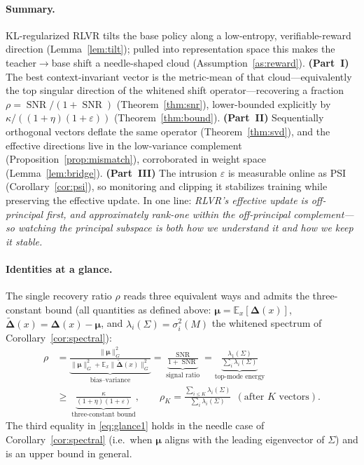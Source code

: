 \documentclass[11pt]{article}
\DeclareMathOperator{\SNR}{SNR}
\newcommand{\E}{\mathbb{E}}
\newcommand{\bDelta}{\bm{\Delta}}
\newcommand{\bmu}{\bm{\mu}}
\newcommand{\Gnorm}[1]{\lVert #1\rVert_G}
\begin{document}
\paragraph{Summary.}
KL-regularized RLVR tilts the base policy along a low-entropy, verifiable-reward direction
(Lemma~\ref{lem:tilt}); pulled into representation space this makes the teacher$\to$base shift a
needle-shaped cloud (Assumption~\ref{as:reward}). \textbf{(Part~I)} The best context-invariant vector
is the metric-mean of that cloud---equivalently the top singular direction of the whitened shift
operator---recovering a fraction $\rho=\SNR/(1{+}\SNR)$ (Theorem~\ref{thm:snr}), lower-bounded
explicitly by $\kappa/((1{+}\eta)(1{+}\varepsilon))$ (Theorem~\ref{thm:bound}). \textbf{(Part~II)}
Sequentially orthogonal vectors deflate the same operator (Theorem~\ref{thm:svd}), and the effective
directions live in the low-variance complement (Proposition~\ref{prop:mismatch}), corroborated in
weight space (Lemma~\ref{lem:bridge}). \textbf{(Part~III)} The intrusion $\varepsilon$ is measurable
online as PSI (Corollary~\ref{cor:psi}), so monitoring and clipping it stabilizes training while
preserving the effective update. In one line: \emph{RLVR's effective update is off-principal first,
and approximately rank-one within the off-principal complement---so watching the principal subspace
is both how we understand it and how we keep it stable.}

\paragraph{Identities at a glance.}
The single recovery ratio $\rho$ reads three equivalent ways and admits the three-constant bound
(all quantities as defined above: $\bmu=\E_x[\bDelta(x)]$, $\tilde{\bDelta}(x)=\bDelta(x)-\bmu$,
and $\lambda_i(\Sigma)=\sigma_i^2(M)$ the whitened spectrum of Corollary~\ref{cor:spectral}):
\begin{align}
\rho
&=\underbrace{\frac{\Gnorm{\bmu}^2}{\Gnorm{\bmu}^2+\E_x\Gnorm{\tilde{\bDelta}(x)}^2}}_{\text{bias--variance}}
 =\underbrace{\frac{\SNR}{1+\SNR}}_{\text{signal ratio}}
 =\underbrace{\frac{\lambda_1(\Sigma)}{\sum_i\lambda_i(\Sigma)}}_{\text{top-mode energy}}
 \label{eq:glance1}\\[6pt]
&\ge\ \underbrace{\frac{\kappa}{(1+\eta)(1+\varepsilon)}}_{\text{three-constant bound}},
 \qquad
 \rho_K=\frac{\sum_{i\le K}\lambda_i(\Sigma)}{\sum_i\lambda_i(\Sigma)}\ \ (\text{after $K$ vectors}).
 \label{eq:glance2}
\end{align}
The third equality in \eqref{eq:glance1} holds in the needle case of Corollary~\ref{cor:spectral}
(i.e.\ when $\bmu$ aligns with the leading eigenvector of $\Sigma$) and is an upper bound in
general.

\end{document}
